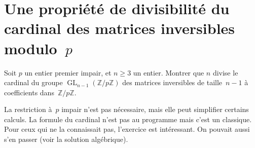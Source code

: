 \section{Une propriété de divisibilité du cardinal des matrices inversibles modulo~$p$}

Soit $p$ un entier premier impair, et $n\geq 3$ un entier. Montrer que $n$
divise le cardinal du groupe $\operatorname{GL}_{n-1}(\mathbb{Z}/p\mathbb{Z})$ des
matrices inversibles de taille~$n-1$ à coefficients
dans~$\mathbb{Z}/p\mathbb{Z}$.

\begin{em}
  La restriction à~$p$ impair n'est pas nécessaire, mais elle peut simplifier
  certains calculs.
  La formule du cardinal n'est pas au programme mais c'est un classique.
  Pour ceux qui ne la connaissait pas, l'exercice est intéressant.
  On pouvait aussi s'en passer (voir la solution algébrique).
\end{em}

